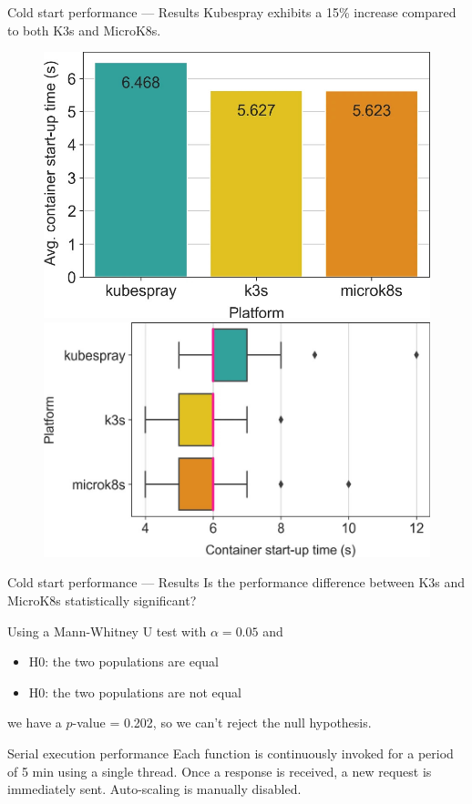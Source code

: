 \begin{frame}{Cold start performance — Results}
Kubespray exhibits a 15\% increase compared to both K3s and MicroK8s.

\begin{figure}
    \includegraphics[width=0.5\linewidth]{static/11227_2022_4430_Fig1_HTML.jpg}\hfill
    \includegraphics[width=0.5\linewidth]{static/11227_2022_4430_Fig2_HTML.jpg}
\end{figure}

\end{frame}

\begin{frame}{Cold start performance — Results}
Is the performance difference between K3s and MicroK8s statistically significant?
\pause

Using a Mann-Whitney U test with \(\alpha = 0.05\) and 
\begin{itemize}
    \item H0: the two populations are equal
    \item H0: the two populations are not equal
\end{itemize}

we have a \(p\)-value = 0.202, so we can't reject the null hypothesis.

\end{frame}

\begin{frame}{Serial execution performance}
Each function is continuously invoked for a period of 5 min using a single thread. Once a response is received, a new request is immediately sent. Auto-scaling is manually disabled.
\end{frame}

